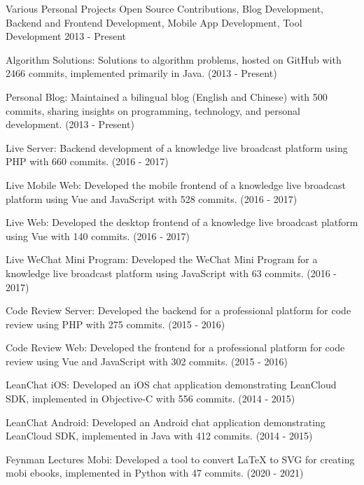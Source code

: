 \begin{cventries}
  \cventry
    {Various Personal Projects} %
    {Open Source Contributions, Blog Development, Backend and Frontend Development, Mobile App Development, Tool Development} %
    {} %
    {2013 - Present} %
    {
      \begin{cvitems} %
        \item {Algorithm Solutions: Solutions to algorithm problems, hosted on GitHub with 2466 commits, implemented primarily in Java. (2013 - Present)}
        \item {Personal Blog: Maintained a bilingual blog (English and Chinese) with 500 commits, sharing insights on programming, technology, and personal development. (2013 - Present)}
        \item {Live Server: Backend development of a knowledge live broadcast platform using PHP with 660 commits. (2016 - 2017)}
        \item {Live Mobile Web: Developed the mobile frontend of a knowledge live broadcast platform using Vue and JavaScript with 528 commits. (2016 - 2017)}
        \item {Live Web: Developed the desktop frontend of a knowledge live broadcast platform using Vue with 140 commits. (2016 - 2017)}
        \item {Live WeChat Mini Program: Developed the WeChat Mini Program for a knowledge live broadcast platform using JavaScript with 63 commits. (2016 - 2017)}
        \item {Code Review Server: Developed the backend for a professional platform for code review using PHP with 275 commits. (2015 - 2016)}
        \item {Code Review Web: Developed the frontend for a professional platform for code review using Vue and JavaScript with 302 commits. (2015 - 2016)}
        \item {LeanChat iOS: Developed an iOS chat application demonstrating LeanCloud SDK, implemented in Objective-C with 556 commits. (2014 - 2015)}
        \item {LeanChat Android: Developed an Android chat application demonstrating LeanCloud SDK, implemented in Java with 412 commits. (2014 - 2015)}
        \item {Feynman Lectures Mobi: Developed a tool to convert LaTeX to SVG for creating mobi ebooks, implemented in Python with 47 commits. (2020 - 2021)}
      \end{cvitems}
    }

\end{cventries}
